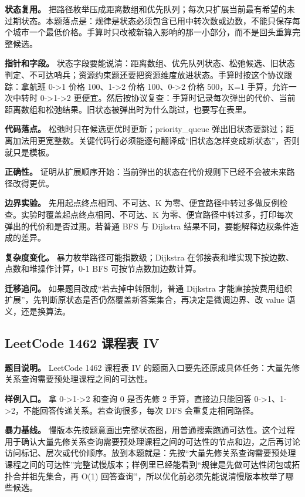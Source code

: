 \textbf{状态复用。} 把路径枚举压成距离数组和优先队列；每次只扩展当前最有希望的未过期状态。本题落点是：规律是状态必须包含已用中转次数或边数，不能只保存每个城市一个最低价格。手算时只改被新输入影响的那一小部分，而不是回头重算完整候选。

\textbf{指针和字段。} 状态字段要能说清：距离数组、优先队列状态、松弛候选、旧状态判定、不可达哨兵；资源约束题还要把资源维度放进状态。手算时按这个协议跟踪：拿航班 0->1 价格 100、1->2 价格 100、0->2 价格 500，K=1 手算，允许一次中转时 0->1->2 更便宜。然后按协议复查：手算时记录每次弹出的代价、当前距离数组和松弛结果。旧状态被弹出时为什么跳过，也要写在表里。

\textbf{代码落点。} 松弛时只在候选更优时更新；priority\_queue 弹出旧状态要跳过；距离加法用更宽整数。关键代码行必须能逐句翻译成“旧状态怎样变成新状态”，否则就只是模板。

\textbf{正确性。} 证明从扩展顺序开始：当前弹出的状态在代价规则下已经不会被未来路径改得更优。

\textbf{边界实验。} 先用起点终点相同、不可达、K 为零、便宜路径中转过多做反例检查。实验时覆盖起点终点相同、不可达、K 为零、便宜路径中转过多，打印每次弹出的代价和是否过期。若普通 BFS 与 Dijkstra 结果不同，要能解释边权条件造成的差异。

\textbf{复杂度变化。} 暴力枚举路径可能指数级；Dijkstra 在邻接表和堆实现下按边数、点数和堆操作计算，0-1 BFS 可按节点数加边数计算。

\textbf{迁移追问。} 如果题目改成“若去掉中转限制，普通 Dijkstra 才能直接按费用组织扩展”，先判断原状态是否仍然覆盖新答案集合，再决定是微调边界、改 value 语义，还是换算法。

\subsection{LeetCode 1462 课程表 IV}

\textbf{题目说明。} LeetCode 1462 课程表 IV 的题面入口要先还原成具体任务：大量先修关系查询需要预处理课程之间的可达性。

\textbf{样例入口。} 拿 0->1->2 和查询 0 是否先修 2 手算，直接边只能回答 0->1、1->2，不能回答传递关系。若查询很多，每次 DFS 会重复走相同路径。

\textbf{暴力基线。} 慢版本先按题意画出完整状态图，用普通搜索跑通可达性。这个过程用于确认大量先修关系查询需要预处理课程之间的可达性的节点和边，之后再讨论访问标记、层次或代价顺序。放到本题就是：先按“大量先修关系查询需要预处理课程之间的可达性”完整试慢版本；样例里已经能看到“规律是先做可达性闭包或拓扑合并祖先集合，再 O(1) 回答查询”，所以优化前必须先能说清慢版本枚举了哪些候选。

